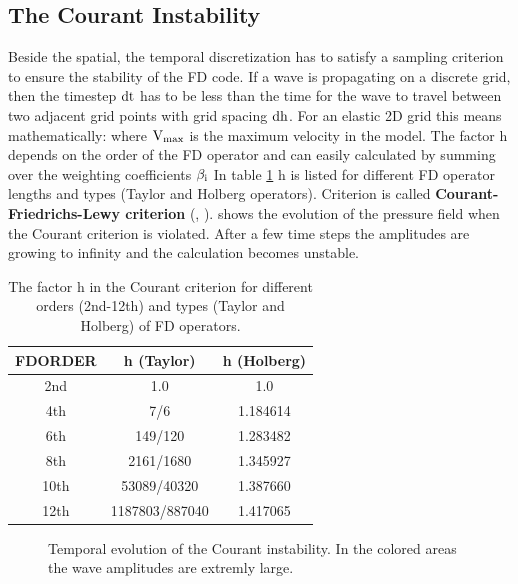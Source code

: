\subsection{The Courant Instability}\label{courandt}
Beside the spatial, the temporal discretization has to satisfy a sampling criterion to ensure the stability of the FD code. If a 
wave is propagating on a discrete grid, then the timestep $\rm{dt}$ has to be less than the time for the wave to travel between two adjacent grid 
points with grid spacing $\rm{dh}$. For an elastic 2D grid this means mathematically:
where $\rm{V_{max}}$ is the maximum velocity in the model. The factor h depends on the order of the FD operator and can easily calculated by summing over the weighting coefficients $\rm{\beta_i}$
In table \ref{courant.1} h is listed for different FD operator lengths and types (Taylor and Holberg operators). Criterion  
is called {\bf{Courant-Friedrichs-Lewy criterion}} (\cite{courant:28}, \cite{courant:67}).  shows the evolution of the pressure field when the Courant criterion is violated. After a few time steps the amplitudes are growing to infinity and the calculation becomes unstable.
\begin{table}[hbt]
\begin{center}
\begin{tabular}{ccc}\hline \hline
FDORDER & h (Taylor)      & h (Holberg) \\ \hline 
2nd   &   1.0             &  1.0        \\
4th   &   7/6             &  1.184614   \\
6th   &   149/120         &  1.283482   \\
8th   &   2161/1680       &  1.345927   \\
10th  &   53089/40320     &  1.387660   \\
12th  &   1187803/887040  &  1.417065   \\   
\hline \hline
\end{tabular}
\caption{\label{courant.1} The factor h in the Courant criterion for different orders (2nd-12th) and types (Taylor and Holberg) of FD operators.}
\end{center}
\end{table} 
\clearpage
\begin{figure}[ht]
\begin{center}
\caption{\label{courandt_pics} Temporal evolution of the Courant instability. In the colored areas the wave amplitudes are extremly large.}
\end{center}
\end{figure}
\clearpage

